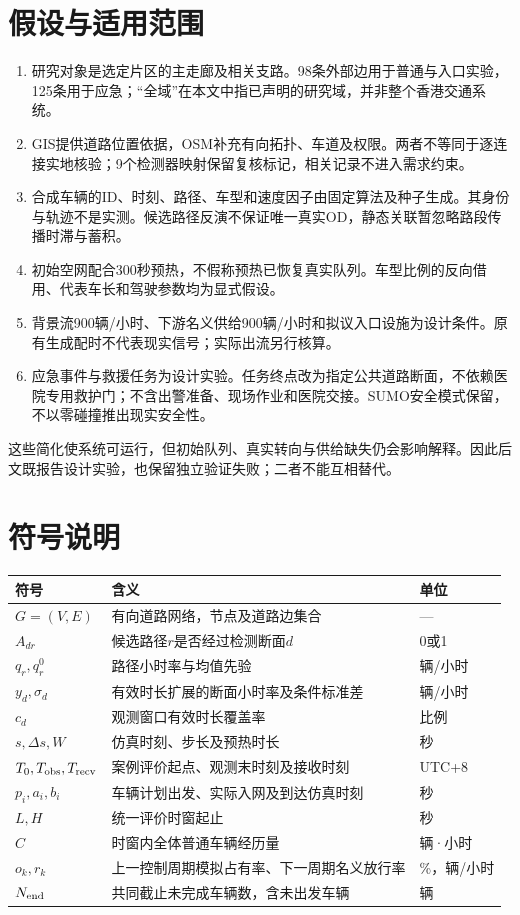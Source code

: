 \documentclass[UTF8,fontset=windows,zihao=-4,a4paper]{ctexart}
\begin{document}
\section{假设与适用范围}
\begin{enumerate}
\item 研究对象是选定片区的主走廊及相关支路。98条外部边用于普通与入口实验，125条用于应急；“全域”在本文中指已声明的研究域，并非整个香港交通系统。
\item GIS提供道路位置依据，OSM补充有向拓扑、车道及权限。两者不等同于逐连接实地核验；9个检测器映射保留复核标记，相关记录不进入需求约束。
\item 合成车辆的ID、时刻、路径、车型和速度因子由固定算法及种子生成。其身份与轨迹不是实测。候选路径反演不保证唯一真实OD，静态关联暂忽略路段传播时滞与蓄积。
\item 初始空网配合300秒预热，不假称预热已恢复真实队列。车型比例的反向借用、代表车长和驾驶参数均为显式假设。
\item 背景流900辆/小时、下游名义供给900辆/小时和拟议入口设施为设计条件。原有生成配时不代表现实信号；实际出流另行核算。
\item 应急事件与救援任务为设计实验。任务终点改为指定公共道路断面，不依赖医院专用救护门；不含出警准备、现场作业和医院交接。SUMO安全模式保留，不以零碰撞推出现实安全性。
\end{enumerate}

这些简化使系统可运行，但初始队列、真实转向与供给缺失仍会影响解释。因此后文既报告设计实验，也保留独立验证失败；二者不能互相替代。

\section{符号说明}
\noindent\begin{tabularx}{\textwidth}{lYl}
\toprule 符号 & 含义 & 单位\\\midrule
$G=(V,E)$ & 有向道路网络，节点及道路边集合 & —\\
$A_{dr}$ & 候选路径$r$是否经过检测断面$d$ & 0或1\\
$q_r,q_r^0$ & 路径小时率与均值先验 & 辆/小时\\
$y_d,\sigma_d$ & 有效时长扩展的断面小时率及条件标准差 & 辆/小时\\
$c_d$ & 观测窗口有效时长覆盖率 & 比例\\
$s,\Delta s,W$ & 仿真时刻、步长及预热时长 & 秒\\
$T_0,T_{\rm obs},T_{\rm recv}$ & 案例评价起点、观测末时刻及接收时刻 & UTC+8\\
$p_i,a_i,b_i$ & 车辆计划出发、实际入网及到达仿真时刻 & 秒\\
$L,H$ & 统一评价时窗起止 & 秒\\
$C$ & 时窗内全体普通车辆经历量 & 辆·小时\\
$o_k,r_k$ & 上一控制周期模拟占有率、下一周期名义放行率 & \%，辆/小时\\
$N_{\rm end}$ & 共同截止未完成车辆数，含未出发车辆 & 辆\\
\bottomrule
\end{tabularx}
\end{document}
